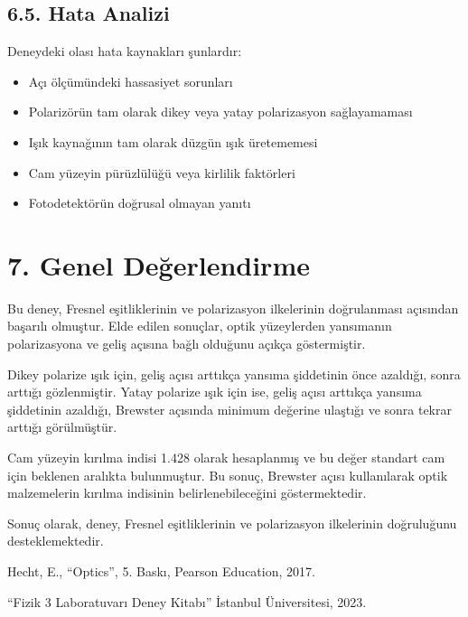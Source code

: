 \documentclass[11pt,letterpaper,twocolumn]{fenbil}
\begin{document}
\subsection*{6.5. Hata Analizi}
Deneydeki olası hata kaynakları şunlardır:
\begin{itemize}
    \item Açı ölçümündeki hassasiyet sorunları
    \item Polarizörün tam olarak dikey veya yatay polarizasyon sağlayamaması
    \item Işık kaynağının tam olarak düzgün ışık üretememesi
    \item Cam yüzeyin pürüzlülüğü veya kirlilik faktörleri
    \item Fotodetektörün doğrusal olmayan yanıtı
\end{itemize}

\section*{7. Genel Değerlendirme}
Bu deney, Fresnel eşitliklerinin ve polarizasyon ilkelerinin doğrulanması açısından başarılı olmuştur. Elde edilen sonuçlar, optik yüzeylerden yansımanın polarizasyona ve geliş açısına bağlı olduğunu açıkça göstermiştir.

Dikey polarize ışık için, geliş açısı arttıkça yansıma şiddetinin önce azaldığı, sonra arttığı gözlenmiştir. Yatay polarize ışık için ise, geliş açısı arttıkça yansıma şiddetinin azaldığı, Brewster açısında minimum değerine ulaştığı ve sonra tekrar arttığı görülmüştür.

Cam yüzeyin kırılma indisi 1.428 olarak hesaplanmış ve bu değer standart cam için beklenen aralıkta bulunmuştur. Bu sonuç, Brewster açısı kullanılarak optik malzemelerin kırılma indisinin belirlenebileceğini göstermektedir.

Sonuç olarak, deney, Fresnel eşitliklerinin ve polarizasyon ilkelerinin doğruluğunu desteklemektedir.

\renewcommand{\refname}{Kaynaklar}
\begin{thebibliography}{9}

 Hecht, E., ``Optics'', 5. Baskı, Pearson Education, 2017.

 ``Fizik 3 Laboratuvarı Deney Kitabı'' İstanbul Üniversitesi, 2023.

\end{thebibliography}
\end{document}
